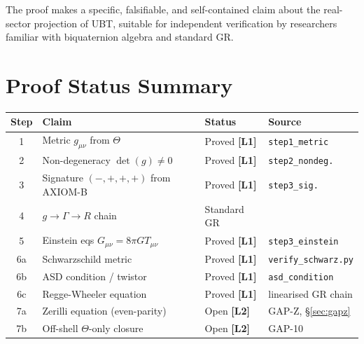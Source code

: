 \documentclass[12pt,a4paper]{article}
\theoremstyle{definition}
\theoremstyle{remark}
\newcommand{\Lone}{\textbf{[L1]}}
\newcommand{\Ltwo}{\textbf{[L2]}}
\begin{document}
The proof makes a specific, falsifiable, and self-contained claim about the
real-sector projection of UBT, suitable for independent verification by
researchers familiar with biquaternion algebra and standard GR.

\section{Proof Status Summary}
\label{sec:summary}

\begin{tcolorbox}[colback=blue!3!white,colframe=blue!55!black,
  title={T1\_GR Proof Status: Complete (on-shell classical GR)}]
{\small
\begin{tabularx}{\linewidth}{clXl}
\toprule
\textbf{Step} & \textbf{Claim} & \textbf{Status} & \textbf{Source} \\
\midrule
1 & Metric $g_{\mu\nu}$ from $\Theta$ & Proved \Lone & \texttt{step1\_metric} \\
2 & Non-degeneracy $\det(g)\neq 0$ & Proved \Lone & \texttt{step2\_nondeg.} \\
3 & Signature $(-,+,+,+)$ from AXIOM-B & Proved \Lone & \texttt{step3\_sig.} \\
4 & $g \to \Gamma \to R$ chain & Standard GR & \cite{wald1984,mtw1973} \\
5 & Einstein eqs $G_{\mu\nu}=8\pi GT_{\mu\nu}$ & Proved \Lone & \texttt{step3\_einstein} \\
6a & Schwarzschild metric & Proved \Lone & \texttt{verify\_schwarz.py} \\
6b & ASD condition / twistor & Proved \Lone & \texttt{asd\_condition} \\
6c & Regge-Wheeler equation & Proved \Lone & linearised GR chain \\
7a & Zerilli equation (even-parity) & Open \Ltwo & GAP-Z, \S\ref{sec:gapz} \\
7b & Off-shell $\Theta$-only closure & Open \Ltwo & GAP-10 \\
\bottomrule
\end{tabularx}
}
\end{tcolorbox}

\appendix

\end{document}
